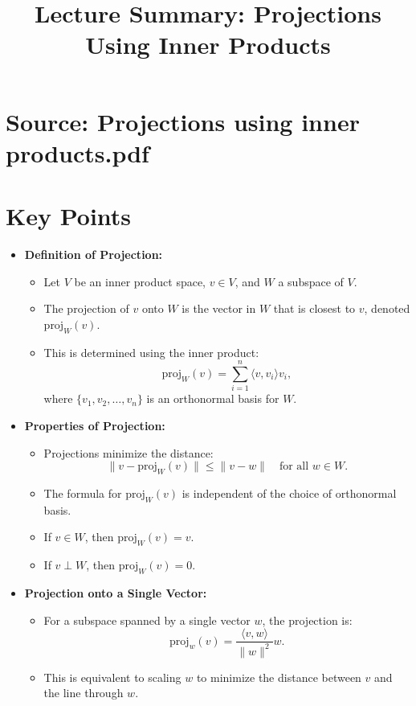 \documentclass{article}
\title{Lecture Summary: Projections Using Inner Products}
\author{}
\date{}
\begin{document}
\maketitle

\section*{Source: Projections using inner products.pdf}

\section*{Key Points}

\begin{itemize}
  \item \textbf{Definition of Projection:}
    \begin{itemize}
      \item Let $V$ be an inner product space, $v \in V$, and $W$ a subspace of $V$.
      \item The projection of $v$ onto $W$ is the vector in $W$ that is closest to $v$, denoted $\text{proj}_W(v)$.
      \item This is determined using the inner product:
        \[
          \text{proj}_W(v) = \sum_{i=1}^n \langle v, v_i \rangle v_i,
        \]
        where $\{v_1, v_2, \dots, v_n\}$ is an orthonormal basis for $W$.
    \end{itemize}

  \item \textbf{Properties of Projection:}
    \begin{itemize}
      \item Projections minimize the distance:
        \[
          \|v - \text{proj}_W(v)\| \leq \|v - w\| \quad \text{for all } w \in W.
        \]
      \item The formula for $\text{proj}_W(v)$ is independent of the choice of orthonormal basis.
      \item If $v \in W$, then $\text{proj}_W(v) = v$.
      \item If $v \perp W$, then $\text{proj}_W(v) = 0$.
    \end{itemize}

  \item \textbf{Projection onto a Single Vector:}
    \begin{itemize}
      \item For a subspace spanned by a single vector $w$, the projection is:
        \[
          \text{proj}_w(v) = \frac{\langle v, w \rangle}{\|w\|^2} w.
        \]
      \item This is equivalent to scaling $w$ to minimize the distance between $v$ and the line through $w$.
    \end{itemize}


\end{itemize}
\end{document}
